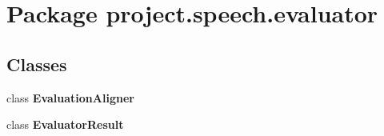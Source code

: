 \section{Package project.\+speech.\+evaluator}
\label{namespaceproject_1_1speech_1_1evaluator}
\subsection*{Classes}
\begin{DoxyCompactItemize}
\item 
class {\bf Evaluation\+Aligner}
\item 
class {\bf Evaluator\+Result}
\end{DoxyCompactItemize}

